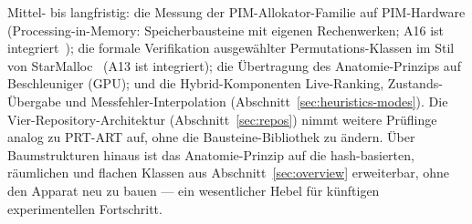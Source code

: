 \begin{nurkurz}
\medskip
Mittel- bis langfristig: die Messung der PIM-Allokator-Familie auf PIM-Hardware (Processing-in-Memory:
Speicherbausteine mit eigenen Rechenwerken; A16 ist integriert~\cite{pimmalloc2026}); die formale
Verifikation ausgewählter Permutations-Klassen im Stil von StarMalloc~\cite{reitz2024starmalloc} (A13 ist
integriert); die Übertragung des Anatomie-Prinzips auf Beschleuniger (GPU); und die Hybrid-Komponenten
Live-Ranking, Zustands-Übergabe und Messfehler-Interpolation (Abschnitt~\ref{sec:heuristics-modes}). Die
Vier-Repository-Architektur (Abschnitt~\ref{sec:repos}) nimmt weitere Prüflinge analog zu PRT-ART auf, ohne
die Bausteine-Bibliothek zu ändern. Über Baumstrukturen hinaus ist das Anatomie-Prinzip
auf die hash-basierten, räumlichen und flachen Klassen aus Abschnitt~\ref{sec:overview} erweiterbar, ohne
den
Apparat neu zu bauen --- ein wesentlicher Hebel für künftigen experimentellen Fortschritt.
\end{nurkurz}

